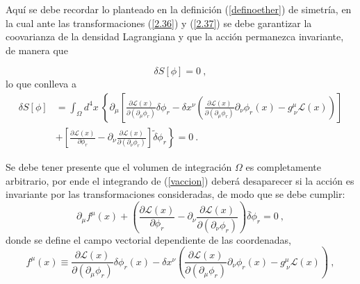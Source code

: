 \noindent
Aquí se debe recordar lo planteado en la definición (\ref{definoether}) de simetría, en la cual ante las transformaciones (\ref{2.36}) y (\ref{2.37}) se debe garantizar la coovarianza de la densidad Lagrangiana y que la acción permanezca invariante, de manera que

\begin{equation}
    \delta S \left[\phi \right] = 0~,
\end{equation}
lo que conlleva a
\begin{equation}
    \begin{split}
    \delta S \left[\phi \right] &=\int_{\Omega }d^{4}x~\left\{ \partial _{\mu }\left[ \frac{\partial \mathcal{L}\left( x\right) }{\partial \left( \partial _{\mu }\phi_{r}\right) }\delta \phi _{r}-\delta x^{\nu }\left( \frac{\partial \mathcal{L}\left( x\right) }{\partial \left( \partial _{\mu }\phi _{r}\right) } \partial _{\nu }\phi _{r}\left( x\right) -g_{~\nu }^{\mu }\mathcal{L}\left(x\right) \right) \right] \right.   \\
    &+\left. \left[ \frac{\partial \mathcal{L}\left( x\right) }{\partial \phi_{r}}-\partial _{\nu }\frac{\partial \mathcal{L}\left( x\right) }{\partial \left( \partial _{\nu }\phi _{r}\right) }\right] \tilde{\delta}\phi_{r}\right\}=0 ~. \label{vaccion}
    \end{split}
\end{equation}

\noindent
Se debe tener presente que el volumen de integración $\Omega$ es completamente arbitrario, por ende el integrando de (\ref{vaccion}) deberá desaparecer si la acción es invariante por las transformaciones consideradas, de modo que se debe cumplir:
\begin{equation}
    \partial_{\mu}f^{\mu}(x)+\left( \frac{\partial \mathcal{L}\left( x\right) }{\partial \phi_{r}}-\partial _{\nu }\frac{\partial \mathcal{L}\left( x\right) }{\partial \left( \partial _{\nu }\phi _{r}\right) }\right)\bar{\delta}\phi_{r}=0~,
    \label{intcero}
\end{equation}
\noindent
donde se define el campo vectorial dependiente de las coordenadas,
\begin{equation}
\boxed{
    f^{\mu}(x) \equiv \frac{\partial \mathcal{L}\left( x\right) }{\partial \left( \partial _{\mu }\phi_{r}\right) }\delta \phi _{r}(x)-\delta x^{\nu }\left( \frac{\partial \mathcal{L}\left( x\right) }{\partial \left( \partial _{\mu }\phi _{r}\right) } \partial _{\nu }\phi _{r}\left( x\right) -g_{~\nu }^{\mu }\mathcal{L}\left(x\right) \right)~,
    \label{fmu}
    }
\end{equation}

